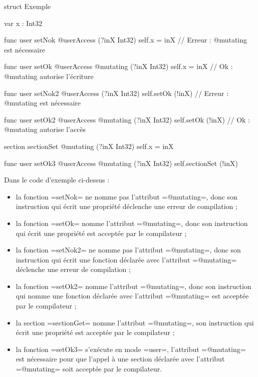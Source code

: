 \begin{OMNIBUS}
struct Exemple {
  var x : Int32

  func user setNok @userAccess (?inX Int32) {
    self.x = inX // Erreur : @mutating est nécessaire
  }

  func user setOk @userAccess @mutating (?inX Int32) {
    self.x = inX // Ok : @mutating autorise l'écriture
  }

  func user setNok2 @userAccess (?inX Int32) {
    self.setOk (!inX) // Erreur : @mutating est nécessaire
  }

  func user setOk2 @userAccess @mutating (?inX Int32) {
    self.setOk (!inX) // Ok : @mutating autorise l'accès
  }

  section sectionSet @mutating (?inX Int32) {
    self.x = inX
  }

  func user setOk3 @userAccess @mutating (?inX Int32) {
    self.sectionSet (!inX)
  }

}
\end{OMNIBUS}

Dans le code d'exemple ci-dessus :
\begin{itemize}
  \item la fonction \omnibus=setNok= ne nomme pas l'attribut \omnibus=@mutating=, donc son instruction qui écrit une propriété déclenche une erreur de compilation ;
  \item la fonction \omnibus=setOk= nomme l'attribut \omnibus=@mutating=, donc son instruction qui écrit une propriété est acceptée par le compilateur ;
  \item la fonction \omnibus=setNok2= ne nomme pas l'attribut \omnibus=@mutating=, donc son instruction qui écrit une fonction déclarée avec l'attribut \omnibus=@mutating= déclenche une erreur de compilation ;
  \item la fonction \omnibus=setOk2= nomme l'attribut \omnibus=@mutating=, donc son instruction qui nomme une fonction déclarée avec l'attribut \omnibus=@mutating= est acceptée par le compilateur ;
  \item la section \omnibus=sectionGet= nomme l'attribut \omnibus=@mutating=, son instruction qui écrit une propriété est acceptée par le compilateur ;
  \item la fonction \omnibus=setOk3= s'exécute en mode \omnibus=user=, l'attribut \omnibus=@mutating= est nécessaire pour que l'appel à une section déclarée avec l'attribut \omnibus=@mutating= soit acceptée par le compilateur.
\end{itemize}












